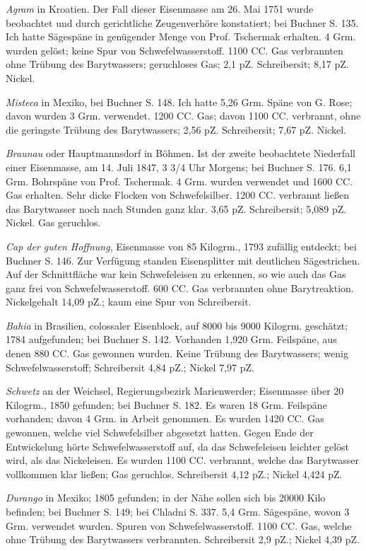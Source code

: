 \documentclass[a4paper, 11pt, oneside, german]{article}
\begin{document}
\emph{Agram} in Kroatien. Der Fall dieser Eisenmasse am 26. Mai 1751 wurde beobachtet und durch gerichtliche Zeugenverhöre konstatiert; bei Buchner S. 135. Ich hatte Sägespäne in genügender Menge von Prof. Tschermak erhalten. 4 Grm. wurden gelöst; keine Spur von Schwefelwasserstoff. 1100 CC. Gas verbrannten ohne Trübung des Barytwassers; geruchloses Gas; 2,1 pZ. Schreibersit; 8,17 pZ. Nickel.

\emph{Misteca} in Mexiko, bei Buchner S. 148. Ich hatte 5,26 Grm. Späne von G. Rose; davon wurden 3 Grm. verwendet. 1200 CC. Gas; davon 1100 CC. verbrannt, ohne die geringste Trübung des Barytwassers; 2,56 pZ. Schreibersit; 7,67 pZ. Nickel.

\emph{Braunau} oder Hauptmannsdorf in Böhmen. Ist der zweite beobachtete Niederfall einer Eisenmasse, am 14. Juli 1847, 3 3/4 Uhr Morgens; bei Buchner S. 176. 6,1 Grm. Bohrspäne von Prof. Tschermak. 4 Grm. wurden verwendet und 1600 CC. Gas erhalten. Sehr dicke Flocken von Schwefelsilber. 1200 CC. verbrannt ließen das Barytwasser noch nach Stunden ganz klar. 3,65 pZ. Schreibersit; 5,089 pZ. Nickel. Gas geruchlos.

\emph{Cap der guten Hoffnung}, Eisenmasse von 85 Kilogrm., 1793 zufällig entdeckt; bei Buchner S. 146. Zur Verfügung standen Eisensplitter mit deutlichen Sägestrichen. Auf der Schnittfläche war kein Schwefeleisen zu erkennen, so wie auch das Gas ganz frei von Schwefelwasserstoff. 600 CC. Gas verbrannten ohne Barytreaktion. Nickelgehalt 14,09 pZ.; kaum eine Spur von Schreibersit.

\emph{Bahia} in Brasilien, colossaler Eisenblock, auf 8000 bis 9000 Kilogrm. geschätzt; 1784 aufgefunden; bei Buchner S. 142. Vorhanden 1,920 Grm. Feilspäne, aus denen 880 CC. Gas gewonnen wurden. Keine Trübung des Barytwassers; wenig Schwefelwasserstoff; Schreibersit 4,84 pZ.; Nickel 7,97 pZ.

\emph{Schwetz} an der Weichsel, Regierungsbezirk Marienwerder; Eisenmasse über 20 Kilogrm., 1850 gefunden; bei Buchner S. 182. Es waren 18 Grm. Feilspäne vorhanden; davon 4 Grm. in Arbeit genommen. Es wurden 1420 CC. Gas gewonnen, welche viel Schwefelsilber abgesetzt hatten. Gegen Ende der Entwickelung hörte Schwefelwasserstoff auf, da das Schwefeleisen leichter gelöst wird, als das Nickeleisen. Es wurden 1100 CC. verbrannt, welche das Barytwasser vollkommen klar ließen; Gas geruchlos. Schreibersit 4,12 pZ.; Nickel 4,424 pZ.

\emph{Durango} in Mexiko; 1805 gefunden; in der Nähe sollen sich bis 20000 Kilo befinden; bei Buchner S. 149; bei Chladni S. 337. 5,4 Grm. Sägespäne, wovon 3 Grm. verwendet wurden. Spuren von Schwefelwasserstoff. 1100 CC. Gas, welche ohne Trübung des Barytwassers verbrannten. Schreibersit 2,9 pZ.; Nickel 4,39 pZ.
\end{document}
